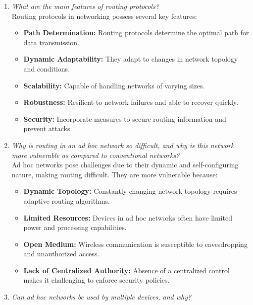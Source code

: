 \documentclass[11pt]{article}
\begin{document}
\begin{enumerate}

    \item \textit{What are the main features of routing protocols?}\\

          Routing protocols in networking possess several key features:
          \begin{itemize}
              \item \textbf{Path Determination:} Routing protocols determine the optimal path for data transmission.
              \item \textbf{Dynamic Adaptability:} They adapt to changes in network topology and conditions.
              \item \textbf{Scalability:} Capable of handling networks of varying sizes.
              \item \textbf{Robustness:} Resilient to network failures and able to recover quickly.
              \item \textbf{Security:} Incorporate measures to secure routing information and prevent attacks.
          \end{itemize}

    \item \textit{Why is routing in an ad hoc network so difficult, and why is this network more vulnerable as compared to conventional networks?}\\

          Ad hoc networks pose challenges due to their dynamic and self-configuring nature, making routing difficult. They are more vulnerable because:
          \begin{itemize}
              \item \textbf{Dynamic Topology:} Constantly changing network topology requires adaptive routing algorithms.
              \item \textbf{Limited Resources:} Devices in ad hoc networks often have limited power and processing capabilities.
              \item \textbf{Open Medium:} Wireless communication is susceptible to eavesdropping and unauthorized access.
              \item \textbf{Lack of Centralized Authority:} Absence of a centralized control makes it challenging to enforce security policies.
          \end{itemize}

    \item \textit{Can ad hoc networks be used by multiple devices, and why?}\\


\end{enumerate}
\end{document}
